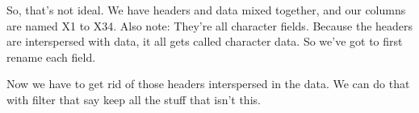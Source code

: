 \documentclass[]{book}
\newenvironment{Shaded}{\begin{snugshade}}{\end{snugshade}}
\newcommand{\DataTypeTok}[1]{\textcolor[rgb]{0.13,0.29,0.53}{#1}}
\newcommand{\KeywordTok}[1]{\textcolor[rgb]{0.13,0.29,0.53}{\textbf{#1}}}
\newcommand{\NormalTok}[1]{#1}
\newcommand{\OperatorTok}[1]{\textcolor[rgb]{0.81,0.36,0.00}{\textbf{#1}}}
\newcommand{\StringTok}[1]{\textcolor[rgb]{0.31,0.60,0.02}{#1}}
\begin{document}
So, that's not ideal. We have headers and data mixed together, and our columns are named X1 to X34. Also note: They're all character fields. Because the headers are interspersed with data, it all gets called character data. So we've got to first rename each field.

\begin{Shaded}
\end{Shaded}

Now we have to get rid of those headers interspersed in the data. We can do that with filter that say keep all the stuff that isn't this.

\begin{Shaded}
\end{Shaded}
\end{document}
